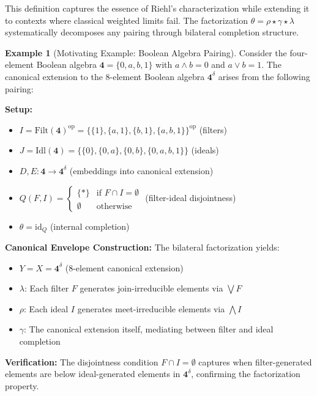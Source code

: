 \documentclass[11pt]{article}
\theoremstyle{plain}
\theoremstyle{definition}
\newtheorem{example}[theorem]{Example}
\theoremstyle{remark}
\newcommand{\op}{\mathrm{op}}
\newcommand{\id}{\mathrm{id}}
\begin{document}
This definition captures the essence of Riehl's characterization while extending it to contexts where classical weighted limits fail. The factorization $\theta = \rho \star \gamma \star \lambda$ systematically decomposes any pairing through bilateral completion structure.

\begin{example}[Motivating Example: Boolean Algebra Pairing]
Consider the four-element Boolean algebra $\mathbf{4} = \{0, a, b, 1\}$ with $a \wedge b = 0$ and $a \vee b = 1$. The canonical extension to the 8-element Boolean algebra $\mathbf{4}^{\delta}$ arises from the following pairing:

\textbf{Setup:}
\begin{itemize}
\item $I = \mathrm{Filt}(\mathbf{4})^{\op} = \{\{1\}, \{a,1\}, \{b,1\}, \{a,b,1\}\}^{\op}$ (filters)
\item $J = \mathrm{Idl}(\mathbf{4}) = \{\{0\}, \{0,a\}, \{0,b\}, \{0,a,b,1\}\}$ (ideals)
\item $D, E : \mathbf{4} \to \mathbf{4}^{\delta}$ (embeddings into canonical extension)
\item $Q(F,I) = \begin{cases} \{*\} & \text{if } F \cap I = \emptyset \\ \emptyset & \text{otherwise} \end{cases}$ (filter-ideal disjointness)
\item $\theta = \id_Q$ (internal completion)
\end{itemize}

\textbf{Canonical Envelope Construction:} The bilateral factorization yields:
\begin{itemize}
\item $Y = X = \mathbf{4}^{\delta}$ (8-element canonical extension)
\item $\lambda$: Each filter $F$ generates join-irreducible elements via $\bigvee F$
\item $\rho$: Each ideal $I$ generates meet-irreducible elements via $\bigwedge I$
\item $\gamma$: The canonical extension itself, mediating between filter and ideal completion
\end{itemize}

\textbf{Verification:} The disjointness condition $F \cap I = \emptyset$ captures when filter-generated elements are below ideal-generated elements in $\mathbf{4}^{\delta}$, confirming the factorization property.
\end{example}
\end{document}
